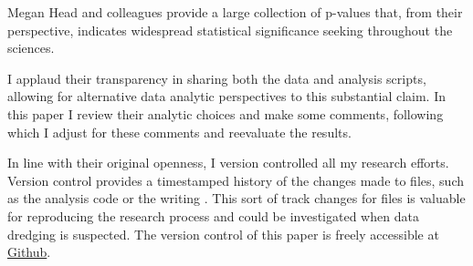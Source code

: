 Megan Head and colleagues provide a large collection of p-values that, from their perspective, indicates widespread statistical significance seeking throughout the sciences. 

I applaud their transparency in sharing both the data and analysis scripts, allowing for alternative data analytic perspectives to this substantial claim. In this paper I review their analytic choices and make some comments, following which I adjust for these comments and reevaluate the results.

In line with their original openness, I version controlled all my research efforts. Version control provides a timestamped history of the changes made to files, such as the analysis code or the writing \citep{Ram2013}. This sort of track changes for files is valuable for reproducing the research process and could be investigated when data dredging is suspected. The version control of this paper is freely accessible at \href{https://github.com/chartgerink/2015head}{Github}.